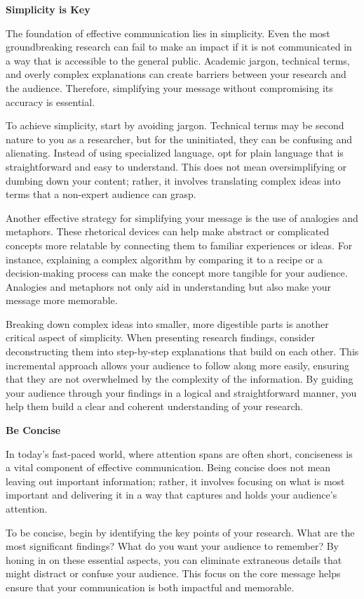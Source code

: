 \documentclass[
]{book}
\begin{document}
\textbf{Simplicity is Key}

The foundation of effective communication lies in simplicity. Even the most groundbreaking research can fail to make an impact if it is not communicated in a way that is accessible to the general public. Academic jargon, technical terms, and overly complex explanations can create barriers between your research and the audience. Therefore, simplifying your message without compromising its accuracy is essential.

To achieve simplicity, start by avoiding jargon. Technical terms may be second nature to you as a researcher, but for the uninitiated, they can be confusing and alienating. Instead of using specialized language, opt for plain language that is straightforward and easy to understand. This does not mean oversimplifying or dumbing down your content; rather, it involves translating complex ideas into terms that a non-expert audience can grasp.

Another effective strategy for simplifying your message is the use of analogies and metaphors. These rhetorical devices can help make abstract or complicated concepts more relatable by connecting them to familiar experiences or ideas. For instance, explaining a complex algorithm by comparing it to a recipe or a decision-making process can make the concept more tangible for your audience. Analogies and metaphors not only aid in understanding but also make your message more memorable.

Breaking down complex ideas into smaller, more digestible parts is another critical aspect of simplicity. When presenting research findings, consider deconstructing them into step-by-step explanations that build on each other. This incremental approach allows your audience to follow along more easily, ensuring that they are not overwhelmed by the complexity of the information. By guiding your audience through your findings in a logical and straightforward manner, you help them build a clear and coherent understanding of your research.

\textbf{Be Concise}

In today's fast-paced world, where attention spans are often short, conciseness is a vital component of effective communication. Being concise does not mean leaving out important information; rather, it involves focusing on what is most important and delivering it in a way that captures and holds your audience's attention.

To be concise, begin by identifying the key points of your research. What are the most significant findings? What do you want your audience to remember? By honing in on these essential aspects, you can eliminate extraneous details that might distract or confuse your audience. This focus on the core message helps ensure that your communication is both impactful and memorable.
\end{document}
